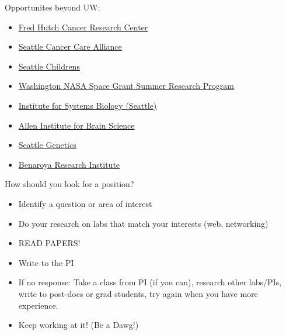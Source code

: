 \begin{frame}
\begin{adjustwidth}{0em}{0em}
        Opportunites beyond UW:
        \begin{itemize}
            \item \href{http://www.fredhutch.org/en/education-training.html}{Fred Hutch Cancer Research Center}
            \item \href{http://www.seattlecca.org/}{Seattle Cancer Care Alliance}
            \item \href{http://www.seattlechildrens.org/}{Seattle Childrens}
            \item \href{http://www.waspacegrant.org/for_students/student_internships/wsgc_internships/SURP_for_students.html}{Washington NASA Space Grant Summer Research Program}
            \item \href{http://www.systemsbiology.org/}{Institute for Systems Biology (Seattle)}
            \item \href{http://alleninstitute.org/}{Allen Institute for Brain Science}
            \item \href{http://www.seattlegenetics.com/}{Seattle Genetics}
            \item \href{https://www.benaroyaresearch.org/}{Benaroya Research Institute}
        \end{itemize}
    \end{adjustwidth}
\end{frame}

\begin{frame}[t]
    \begin{adjustwidth}{-2em}{-1.5em}
        How should you look for a position?

        \begin{itemize}
            \item Identify a question or area of interest

            \vspace{4mm}
            \item Do your research on labs that match your interests (web,
                networking)
            
            \vspace{4mm}
            \item READ PAPERS!

            \vspace{4mm}
            \item Write to the PI

            \vspace{4mm}
            \item If no response: Take a class from PI (if you can), research
                other labs/PIs, write to post-docs or grad students, try again
                when you have more experience.

            \vspace{4mm}
            \item Keep working at it! (Be a Dawg!)
        \end{itemize}
    \end{adjustwidth}
\end{frame}

